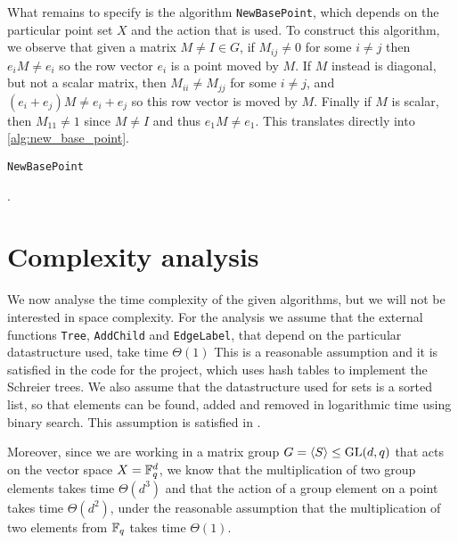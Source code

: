 What remains to specify is the algorithm \texttt{NewBasePoint}, which
depends on the particular point set $X$ and the action that is used.
To construct this algorithm, we observe that given a matrix $M \neq I
\in G$, if $M_{ij} \neq 0$ for some $i \neq j$ then $e_i M \neq e_i$
so the row vector $e_i$ is a point moved by $M$. If $M$ instead is
diagonal, but not a scalar matrix, then $M_{ii} \neq M_{jj}$ for some
$i \neq j$, and $(e_i + e_j) M \neq e_i + e_j$ so this row vector is
moved by $M$. Finally if $M$ is scalar, then $M_{11} \neq 1$ since $M
\neq I$ and thus $e_1 M \neq e_1$. This translates directly into \ref{alg:new_base_point}.

\begin{algorithm} 
\dontprintsemicolon
\caption{\texttt{NewBasePoint}}
.
\Begin
{
  {
    {
      {
      }
    }
  }
  {
    {
      {
      }
    }
  }
}
\label{alg:new_base_point}
\end{algorithm}

\section{Complexity analysis}
We now analyse the time complexity of the given algorithms, but we
will not be interested in space complexity. For the analysis we assume
that the external functions \texttt{Tree}, \texttt{AddChild} and
\texttt{EdgeLabel}, that depend on the particular datastructure used,
take time $\Theta(1)$ This is a reasonable assumption and it is satisfied
in the code for the project, which uses hash tables to implement the Schreier trees. We also assume that the datastructure
used for sets is a sorted list, so that elements can be found, added and
removed in logarithmic time using binary search. This assumption is
satisfied in \GAP.

Moreover, since we are working in a matrix group $G = \left\langle S \right\rangle \leq \operatorname{GL}(d, q)$
that acts on the vector space $X = \mathbb{F}_q^d$, we know that the
multiplication of two group elements takes time $\Theta(d^3)$ and that the action
of a group element on a point takes time $\Theta(d^2)$, under the reasonable
assumption that the multiplication of two elements from $\mathbb{F}_q$ takes time 
$\Theta(1)$.


